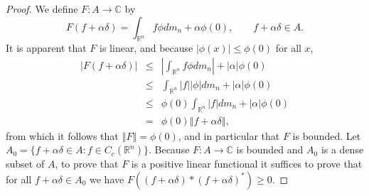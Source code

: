 \documentclass{article}
\newcommand{\norm}[1]{\left\Vert #1 \right\Vert}
\theoremstyle{definition}
\theoremstyle{definition}
\begin{document}
\begin{proof}
We define  $F:A \to \mathbb{C}$ by
\[
F(f+\alpha \delta) = \int_{\mathbb{R}^n} f \phi dm_n + \alpha \phi(0), \qquad f+\alpha \delta \in A.
\]
It is apparent that $F$ is linear, and because $|\phi(x)|\leq \phi(0)$ for all $x$,
\begin{eqnarray*}
|F(f+\alpha \delta)|&\leq&\left| \int_{\mathbb{R}^n} f\phi dm_n\right| + |\alpha| \phi(0)\\
&\leq&\int_{\mathbb{R}^n} |f| |\phi| dm_n + |\alpha| \phi(0)\\
&\leq&\phi(0) \int_{\mathbb{R}^n} |f| dm_n + |\alpha| \phi(0)\\
&=&\phi(0) \norm{f+\alpha \delta},
\end{eqnarray*}
from which it follows that $\norm{F} = \phi(0)$, and in particular that $F$ is bounded.
Let $A_0=\{f+\alpha \delta \in A: f \in C_c(\mathbb{R}^n)\}$. Because $F:A \to \mathbb{C}$ is bounded and $A_0$ is a dense subset
of $A$, to prove that $F$ is a positive linear functional it suffices to prove that for all $f+\alpha \delta \in A_0$ we have
$F((f+\alpha \delta)*(f+\alpha\delta)^*) \geq 0$.


\end{proof}
\end{document}
